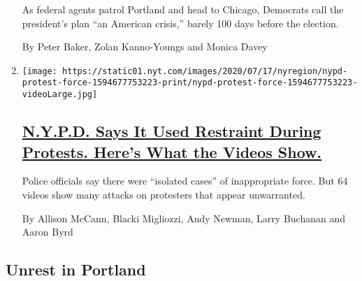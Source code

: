\begin{enumerate}
  As federal agents patrol Portland and head to Chicago, Democrats call
  the president's plan ``an American crisis,'' barely 100 days before
  the election.

  By Peter Baker, Zolan Kanno-Youngs and Monica Davey
\item
  \texttt{[image: https://static01.nyt.com/images/2020/07/17/nyregion/nypd-protest-force-1594677753223-print/nypd-protest-force-1594677753223-videoLarge.jpg]}

  \hypertarget{nypd-says-it-used-restraint-during-protests-heres-what-the-videos-show}{%
  \subsection{\texorpdfstring{\href{/interactive/2020/07/14/nyregion/nypd-george-floyd-protests.html}{N.Y.P.D.
  Says It Used Restraint During Protests. Here's What the Videos
  Show.}}{N.Y.P.D. Says It Used Restraint During Protests. Here's What the Videos Show.}}\label{nypd-says-it-used-restraint-during-protests-heres-what-the-videos-show}}

  Police officials say there were ``isolated cases'' of inappropriate
  force. But 64 videos show many attacks on protesters that appear
  unwarranted.

  By Allison McCann, Blacki Migliozzi, Andy Newman, Larry Buchanan and
  Aaron Byrd
\end{enumerate}

\hypertarget{unrest-in-portland}{%
\subsection{Unrest in Portland}\label{unrest-in-portland}}

